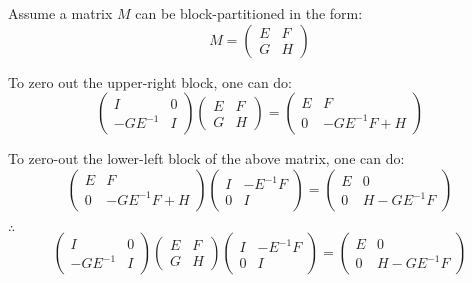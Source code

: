 \documentclass{article}
\begin{document}
Assume a matrix $M$ can be block-partitioned in the form:
\begin{equation*}
M = 
\begin{pmatrix}  E & F \\ G & H \end{pmatrix}
\end{equation*}

To zero out the upper-right block, one can do:
\begin{equation*}
\begin{pmatrix} I & 0 \\ -G E^{-1} & I \end{pmatrix}  \begin{pmatrix}  E & F \\ G & H \end{pmatrix}  = \begin{pmatrix} E & F \\ 0 & -G E^{-1} F + H \end{pmatrix}
\end{equation*}

To zero-out the lower-left block of the above matrix, one can do:
\begin{equation*}
 \begin{pmatrix} E & F \\ 0 & -G E^{-1} F + H \end{pmatrix} \begin{pmatrix} I & -E^{-1}F \\ 0 & I \end{pmatrix}  = \begin{pmatrix} E & 0 \\ 0 & H - G E^{-1} F \end{pmatrix}
\end{equation*}

$\therefore$
\begin{equation*}
\begin{pmatrix} I & 0 \\ -G E^{-1} & I \end{pmatrix}   \begin{pmatrix}  E & F \\ G & H \end{pmatrix} \begin{pmatrix} I & -E^{-1}F \\ 0 & I \end{pmatrix}  =  \begin{pmatrix} E & 0 \\ 0 & H - G E^{-1} F \end{pmatrix}
\end{equation*}
\end{document}

